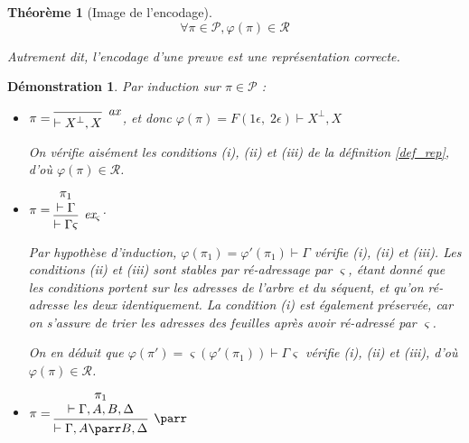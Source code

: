 \documentclass[11pt,a4paper]{article}
\newtheorem{theorem}{Théorème}
\newtheorem{demonstration}{Démonstration}
\newcommand*{\orth}{^\perp}
\newcommand*{\namedproofv}[2]{\hypo{#1}\infer[no rule]{1}{\vdash #2}}
\newcommand*{\axv}[1]{\infer{0}[\ensuremath{\mathit{ax}}]{\vdash #1}}
\newcommand*{\parrv}[1]{\infer{1}[\ensuremath{\parr}]{\vdash #1}}
\newcommand*{\permv}[2]{\infer{1}[\ensuremath{\textit{ex}_{#1}}]{\vdash #2}}
\newcommand*{\permapp}[2]{#2 #1}
\newcommand*{\someperm}{\varsigma}
\newcommand*{\someproof}{\pi}
\newcommand*{\proofs}{\ensuremath{\mathcal{P}}}
\newcommand*{\representations}{\ensuremath{\mathcal{R}}}
\newcommand*{\encode}{\ensuremath{\varphi}}
\begin{document}
\begin{theorem}[Image de l'encodage]
    \begin{equation*}
    \forall \someproof \in \proofs, \encode \left( \someproof \right) \in \representations
    \end{equation*}

    Autrement dit, l'encodage d'une preuve est une représentation correcte.
\end{theorem}

\begin{demonstration}
    Par induction sur $\someproof \in \proofs$ :

    \begin{itemize}
    \item[(i) Axiome :]$\someproof =
    \begin{prooftree}
        \axv{X\orth, X}
    \end{prooftree}$,
    et donc $\encode \left( \someproof \right) = F(1 \epsilon, \; 2 \epsilon) \vdash X\orth, X$

    On vérifie aisément les conditions (i), (ii) et (iii) de la définition \ref{def_rep}, d'où $\encode \left( \someproof \right) \in \representations$.

    \item[(ii) Échange :]$\someproof =
    \begin{prooftree}
        \namedproofv{\pi_1}{\Gamma}
        \permv{\someperm}{\permapp{\someperm}{\Gamma}}
    \end{prooftree}$.
    
    Par hypothèse d'induction, $\encode \left( \pi_1 \right) = \encode ' \left( \pi_1 \right) \vdash \Gamma$ vérifie (i), (ii) et (iii). Les conditions (ii) et (iii) sont stables par ré-adressage par $\someperm$, étant donné que les conditions portent sur les adresses de l'arbre et du séquent, et qu'on ré-adresse les deux identiquement. La condition (i) est également préservée, car on s'assure de trier les adresses des feuilles après avoir ré-adressé par $\someperm$.

    On en déduit que $\encode \left( \someproof' \right) = \someperm \left( \encode ' \left( \pi_1 \right) \right) \vdash \permapp{\someperm}{\Gamma}$ vérifie (i), (ii) et (iii), d'où $\encode \left( \someproof \right) \in \representations$.

    \item[(iii) Par :]$\someproof =
    \begin{prooftree}
      \namedproofv{\pi_1}{\Gamma, A, B, \Delta}
      \parrv{\Gamma, A \parr B, \Delta}
    \end{prooftree}$


\end{itemize}
\end{demonstration}
\end{document}
